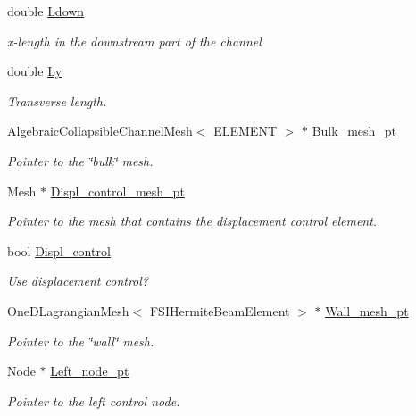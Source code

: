 \begin{DoxyCompactItemize}
double \hyperlink{classFSICollapsibleChannelProblem_a0964686847cc64f2a77a866187aec626}{Ldown}
\begin{DoxyCompactList}\small\item\em x-\/length in the downstream part of the channel \end{DoxyCompactList}\item 
double \hyperlink{classFSICollapsibleChannelProblem_adb381270408cea69b7290ff2aeb5928f}{Ly}
\begin{DoxyCompactList}\small\item\em Transverse length. \end{DoxyCompactList}\item 
Algebraic\+Collapsible\+Channel\+Mesh$<$ E\+L\+E\+M\+E\+NT $>$ $\ast$ \hyperlink{classFSICollapsibleChannelProblem_a74c09286f4ad4242c37b6ea16c069fae}{Bulk\+\_\+mesh\+\_\+pt}
\begin{DoxyCompactList}\small\item\em Pointer to the \char`\"{}bulk\char`\"{} mesh. \end{DoxyCompactList}\item 
Mesh $\ast$ \hyperlink{classFSICollapsibleChannelProblem_acf74b392297104d704004124b8dfc7bb}{Displ\+\_\+control\+\_\+mesh\+\_\+pt}
\begin{DoxyCompactList}\small\item\em Pointer to the mesh that contains the displacement control element. \end{DoxyCompactList}\item 
bool \hyperlink{classFSICollapsibleChannelProblem_afc33ee9a23af728b98ed73623b65e1ac}{Displ\+\_\+control}
\begin{DoxyCompactList}\small\item\em Use displacement control? \end{DoxyCompactList}\item 
One\+D\+Lagrangian\+Mesh$<$ F\+S\+I\+Hermite\+Beam\+Element $>$ $\ast$ \hyperlink{classFSICollapsibleChannelProblem_a071b5cc9f660fdaccf1bf1e256320bfa}{Wall\+\_\+mesh\+\_\+pt}
\begin{DoxyCompactList}\small\item\em Pointer to the \char`\"{}wall\char`\"{} mesh. \end{DoxyCompactList}\item 
Node $\ast$ \hyperlink{classFSICollapsibleChannelProblem_a4f37708b6caa6d79bff16b444c2e19ff}{Left\+\_\+node\+\_\+pt}
\begin{DoxyCompactList}\small\item\em Pointer to the left control node. \end{DoxyCompactList}\item 

\end{DoxyCompactItemize}
